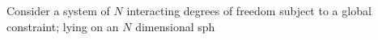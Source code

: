 Consider a system of $N$ interacting degrees of freedom subject to a global constraint; lying on an $N$ dimensional sph